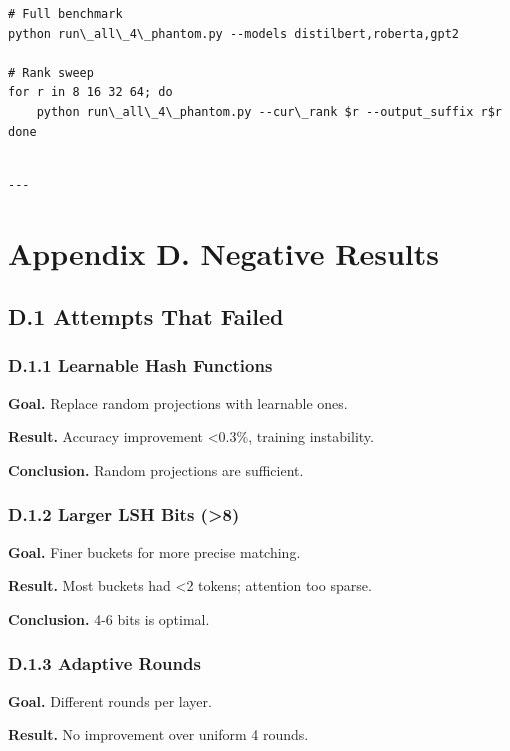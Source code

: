 \begin{lstlisting}
# Full benchmark
python run\_all\_4\_phantom.py --models distilbert,roberta,gpt2

# Rank sweep
for r in 8 16 32 64; do
    python run\_all\_4\_phantom.py --cur\_rank $r --output_suffix r$r
done
\end{lstlisting}
\begin{lstlisting}

---
\end{lstlisting}


\section{Appendix D. Negative Results}

\subsection{D.1 Attempts That Failed}

\subsubsection{D.1.1 Learnable Hash Functions}

\textbf{Goal.} Replace random projections with learnable ones.

\textbf{Result.} Accuracy improvement \textless{}0.3\%, training instability.

\textbf{Conclusion.} Random projections are sufficient.

\subsubsection{D.1.2 Larger LSH Bits (\textgreater{}8)}

\textbf{Goal.} Finer buckets for more precise matching.

\textbf{Result.} Most buckets had \textless{}2 tokens; attention too sparse.

\textbf{Conclusion.} 4-6 bits is optimal.

\subsubsection{D.1.3 Adaptive Rounds}

\textbf{Goal.} Different rounds per layer.

\textbf{Result.} No improvement over uniform 4 rounds.

